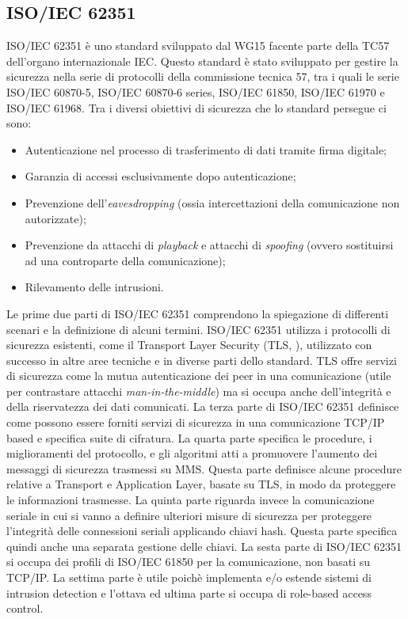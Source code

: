 \subsection{ISO/IEC 62351}
ISO/IEC 62351 è uno standard sviluppato dal WG15 facente parte della TC57 dell'organo internazionale IEC. Questo standard è stato sviluppato per gestire la sicurezza nella serie di protocolli della commissione tecnica 57, tra i quali le serie ISO/IEC 60870-5, ISO/IEC 60870-6 series, ISO/IEC 61850, ISO/IEC 61970 e ISO/IEC 61968.\newpage
Tra i diversi obiettivi di sicurezza che lo standard persegue ci sono:
\begin{itemize}
	\item Autenticazione nel processo di trasferimento di dati tramite firma digitale;
	\item Garanzia di accessi esclusivamente dopo autenticazione;
	\item Prevenzione dell'\emph{eavesdropping} (ossia intercettazioni della comunicazione non autorizzate);
	\item Prevenzione da attacchi di \emph{playback} e attacchi di  \emph{spoofing} (ovvero sostituirsi ad una controparte della comunicazione);
	\item Rilevamento delle intrusioni.
\end{itemize}
Le prime due parti di ISO/IEC 62351 comprendono la spiegazione di differenti scenari e la definizione di alcuni termini. ISO/IEC 62351 utilizza i protocolli di sicurezza esistenti, come il Transport Layer Security (TLS, \cite{tls}), utilizzato con successo in altre aree tecniche e in diverse parti dello standard. TLS offre servizi di sicurezza come la mutua autenticazione dei peer in una comunicazione (utile per contrastare attacchi  \emph{man-in-the-middle}) ma si occupa anche dell'integrità e della riservatezza dei dati comunicati. La terza parte di ISO/IEC 62351 definisce come possono essere forniti servizi di sicurezza in una  comunicazione TCP/IP based e specifica suite di cifratura. La quarta parte specifica le procedure, i miglioramenti del protocollo, e gli algoritmi atti a promuovere l'aumento dei messaggi di sicurezza trasmessi su MMS. Questa parte definisce alcune procedure relative a Transport e Application Layer, basate su TLS, in modo da proteggere le informazioni trasmesse. La quinta parte riguarda invece la comunicazione seriale in cui si vanno a definire ulteriori misure di sicurezza per proteggere l'integrità delle connessioni seriali applicando chiavi hash. Questa parte specifica quindi anche una separata gestione delle chiavi. La sesta parte di ISO/IEC 62351 si occupa dei profili di ISO/IEC 61850 per la comunicazione, non basati su TCP/IP. La settima parte è utile poichè implementa e/o estende sistemi di intrusion detection e l'ottava ed ultima parte si occupa di role-based access control.